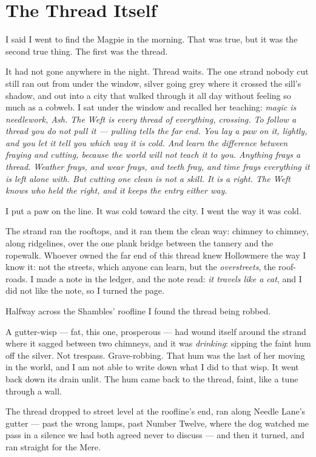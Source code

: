 \chapter{The Thread Itself}

I said I went to find the Magpie in the morning. That was true, but it was the second true thing. The first was the thread.

It had not gone anywhere in the night. Thread waits. The one strand nobody cut still ran out from under the window, silver going grey where it crossed the sill's shadow, and out into a city that walked through it all day without feeling so much as a cobweb. I sat under the window and recalled her teaching: \emph{magic is needlework, Ash. The Weft is every thread of everything, crossing. To follow a thread you do not pull it --- pulling tells the far end. You lay a paw on it, lightly, and you let it tell you which way it is cold. And learn the difference between fraying and cutting, because the world will not teach it to you. Anything frays a thread. Weather frays, and wear frays, and teeth fray, and time frays everything it is left alone with. But cutting one clean is not a skill. It is a right. The Weft knows who held the right, and it keeps the entry either way.}

I put a paw on the line. It was cold toward the city. I went the way it was cold.

The strand ran the rooftops, and it ran them the clean way: chimney to chimney, along ridgelines, over the one plank bridge between the tannery and the ropewalk. Whoever owned the far end of this thread knew Hollowmere the way I know it: not the streets, which anyone can learn, but the \emph{overstreets}, the roof-roads. I made a note in the ledger, and the note read: \emph{it travels like a cat}, and I did not like the note, so I turned the page.

Halfway across the Shambles' roofline I found the thread being robbed.

A gutter-wisp --- fat, this one, prosperous --- had wound itself around the strand where it sagged between two chimneys, and it was \emph{drinking}: sipping the faint hum off the silver. Not trespass. Grave-robbing. That hum was the last of her moving in the world, and I am not able to write down what I did to that wisp. It went back down its drain unlit. The hum came back to the thread, faint, like a tune through a wall.

The thread dropped to street level at the roofline's end, ran along Needle Lane's gutter --- past the wrong lamps, past Number Twelve, where the dog watched me pass in a silence we had both agreed never to discuss --- and then it turned, and ran straight for the Mere.

